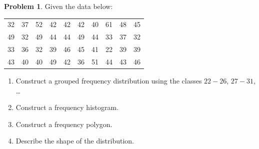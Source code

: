 \documentclass[11pt,a4paper]{article}
\theoremstyle{definition}
\newtheorem{problemx}{Problem}[section]
\newenvironment{problem}{\begin{problemx}}{\end{problemx}}
\begin{document}
\begin{problem}
Given the data below:
\begin{table}[H]
\centering
\begin{tabular}{cccccccccc}
32 & 37 & 52 & 42 & 42 & 42 & 40 & 61 & 48 & 45\\
49 & 32 & 49 & 44 & 44 & 49 & 44 & 33 & 37 & 32\\
33 & 36 & 32 & 39 & 46 & 45 & 41 & 22 & 39 & 39\\
43 & 40 & 40 & 49 & 42 & 36 & 51 & 44 & 43 & 46\\
\end{tabular}
\end{table}
\begin{enumerate}
\item[(a).] Construct a grouped frequency distribution using the classes $22-26$, $27-31$, \dots
\item[(b).] Construct a frequency histogram.
\item[(c).] Construct a frequency polygon.
\item[(d).] Describe the shape of the distribution.
\end{enumerate}
\end{problem}
\end{document}
